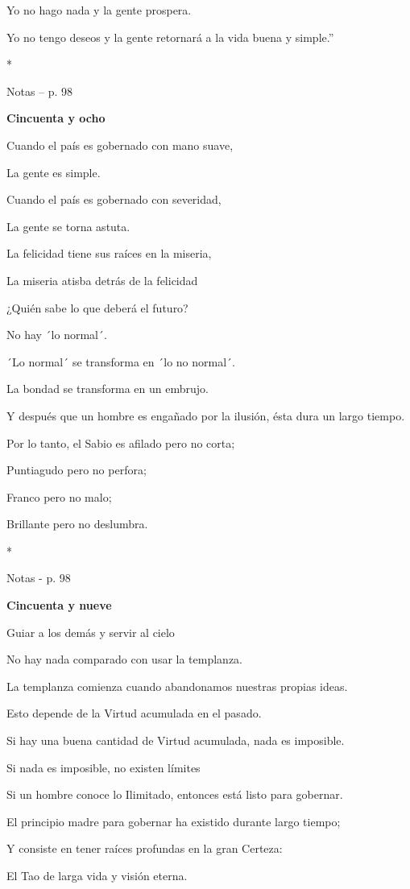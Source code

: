 Yo no hago nada y la gente prospera.

Yo no tengo deseos y la gente retornará a la vida buena y simple.''

*

Notas -- p. 98

\textbf{Cincuenta y ocho}

Cuando el país es gobernado con mano suave,

La gente es simple.

Cuando el país es gobernado con severidad,

La gente se torna astuta.

La felicidad tiene sus raíces en la miseria,

La miseria atisba detrás de la felicidad

¿Quién sabe lo que deberá el futuro?

No hay ´lo normal´.

´Lo normal´ se transforma en ´lo no normal´.

La bondad se transforma en un embrujo.

Y después que un hombre es engañado por la ilusión, ésta dura un largo
tiempo.

Por lo tanto, el Sabio es afilado pero no corta;

Puntiagudo pero no perfora;

Franco pero no malo;

Brillante pero no deslumbra.

*

Notas - p. 98

\textbf{Cincuenta y nueve}

Guiar a los demás y servir al cielo

No hay nada comparado con usar la templanza.

La templanza comienza cuando abandonamos nuestras propias ideas.

Esto depende de la Virtud acumulada en el pasado.

Si hay una buena cantidad de Virtud acumulada, nada es imposible.

Si nada es imposible, no existen límites

Si un hombre conoce lo Ilimitado, entonces está listo para gobernar.

El principio madre para gobernar ha existido durante largo tiempo;

Y consiste en tener raíces profundas en la gran Certeza:

El Tao de larga vida y visión eterna.

